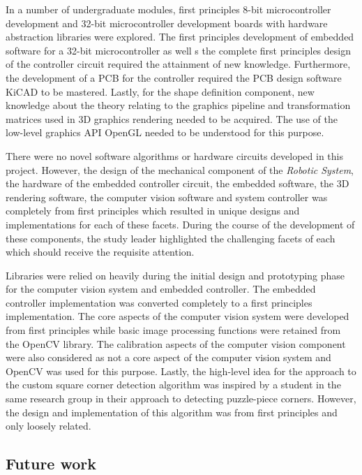 In a number of undergraduate modules, first principles 8-bit microcontroller development and 32-bit microcontroller development boards with hardware abstraction libraries were explored. The first principles development of embedded software for a 32-bit microcontroller as well s the complete first principles design of the controller circuit required the attainment of new knowledge. Furthermore, the development of a PCB for the controller required the PCB design software KiCAD to be mastered. Lastly, for the shape definition component, new knowledge about the theory relating to the graphics pipeline and transformation matrices used in 3D graphics rendering needed to be acquired. The use of the low-level graphics API OpenGL needed to be understood for this purpose.

There were no novel software algorithms or hardware circuits developed in this project. However, the design of the mechanical component of the \textit{Robotic System}, the hardware of the embedded controller circuit, the embedded software, the 3D rendering software, the computer vision software and system controller was completely from first principles which resulted in unique designs and implementations for each of these facets. During the course of the development of these components, the study leader highlighted the challenging facets of each which should receive the requisite attention.

Libraries were relied on heavily during the initial design and prototyping phase for the computer vision system and embedded controller. The embedded controller implementation was converted completely to a first principles implementation. The core aspects of the computer vision system were developed from first principles while basic image processing functions were retained from the OpenCV library. The calibration aspects of the computer vision component were also considered as not a core aspect of the computer vision system and OpenCV was used for this purpose. Lastly, the high-level idea for the approach to the custom square corner detection algorithm was inspired by a student in the same research group in their approach to detecting puzzle-piece corners. However, the design and implementation of this algorithm was from first principles and only loosely related. 

\subsection{Future work}

